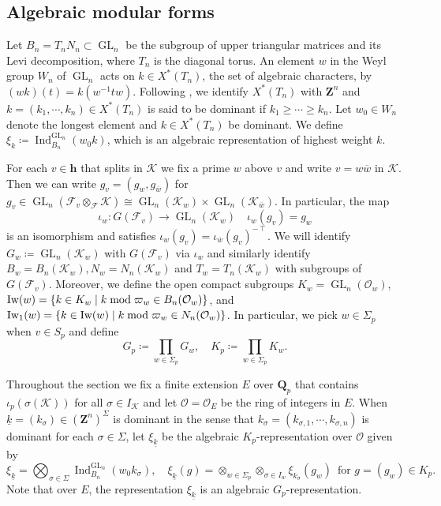 \documentclass[leqno]{amsart}
\theoremstyle{definition}
\theoremstyle{remark}
\newcommand{\oo}{\mathcal{O}}
\newcommand{\Z}{{\mathbf{Z}}}
\newcommand{\Qp}{\mathbf{Q}_p}
\newcommand{\finite}{\mathbf{h}}
\DeclareMathOperator{\Ind}{Ind}
\DeclareMathOperator{\GL}{GL}
\newcommand{\F}{{\mathcal{F}}} %
\newcommand{\K}{{\mathcal{K}}} %
\newcommand{\bw}{{\overline{w}}}
\newcommand{\wt}[1]{\underline{ #1 }}
\newcommand{\Iw}{\textnormal{Iw}} %
\begin{document}
\subsection{Algebraic modular forms}

Let $B_n=T_nN_n\subset \GL_n$ be the subgroup of
upper triangular matrices and its Levi decomposition,
where $T_n$ is the diagonal torus.
An element $w$ in the Weyl group $W_n$ of $\GL_n$
acts on $k\in X^*(T_n)$, the set of algebraic characters,
by $(wk)(t)=k(w^{-1}tw)$.
Following \cite[Def 2.3]{ger},
we identify $X^*(T_n)$ with $\Z^n$
and $k=(k_1,\cdots,k_n)\in X^*(T_n)$
is said to be dominant if $k_1\geq \cdots\geq k_n$.
Let $w_0\in W_n$ denote the longest element
and $k\in X^*(T_n)$ be dominant.
We define $\xi_k\coloneqq \Ind_{B_n}^{\GL_n}(w_0k)$,
which is an algebraic representation 
of highest weight $k$.

For each $v\in\finite$ that splits in $\K$
we fix a prime $w$ above $v$
and write $v=w\bw$ in $\K$.
Then we can write $g_v=(g_w,g_{\bw})$
for $g_v\in \GL_n(\F_v\otimes_\F\K)
\cong \GL_n(\K_w)\times\GL_n(\K_{\bw})$.
In particular, the map
\begin{equation}
\iota_w\colon G(\F_v)\to \GL_n(\K_w)\quad
\iota_w(g_v)=g_w
\end{equation}
is an isomorphism and satisfies
$\iota_w(g_v)=\iota_{\bw}(g_v)^{-\intercal}$.
We will identify $G_w\coloneqq\GL_n(\K_w)$
with $G(\F_v)$ via $\iota_w$
and similarly identify 
$B_w=B_n(\K_w), N_w=N_n(\K_w)$ and
$T_w=T_n(\K_w)$
with subgroups of $G(\F_v)$.
Moreover, we define the open 
compact subgroups
$K_w=\GL_n(\oo_w)$,
$\Iw(w)=\{k\in K_w\mid k\bmod \varpi_w\in B_n(\oo_w)\}$, and
$\Iw_1(w)=\{k\in \Iw(w)\mid k\bmod \varpi_w\in N_n(\oo_w)\}$.
In particular, we pick $w\in \Sigma_p$ when $v\in S_p$ and define
\[
	G_p\coloneqq\prod_{w\in \Sigma_p}G_w,\quad
	K_p\coloneqq\prod_{w\in \Sigma_p}K_w.
\]

Throughout the section
we fix a finite extension $E$ over $\Qp$
that contains $\iota_p(\sigma(\K))$
for all $\sigma\in I_\K$ and
let $\oo=\oo_E$ be the ring of integers in $E$.
When $\wt{k}=(k_\sigma)\in (\Z^n)^{\Sigma}$
is dominant in the sense that
$k_\sigma=(k_{\sigma,1},\cdots,k_{\sigma,n})$
is dominant for each $\sigma\in \Sigma$,
let $\xi_{\wt{k}}$ be
the algebraic $K_p$-representation over $\oo$ given by
\begin{equation}\label{def:algrep}
	\xi_{\wt{k}}=\bigotimes_{\sigma\in \Sigma}
	\Ind_{B_n}^{\GL_n}(w_0k_{\sigma}),\quad
	\xi_{\wt{k}}(g)=
	\otimes_{w\in \Sigma_p}
	\otimes_{\sigma\in I_w}\xi_{k_\sigma}(g_w)\,
	\text{ for } g=(g_w)\in K_p.
\end{equation}
Note that over $E$, the representation $\xi_{\wt{k}}$ 
is an algebraic $G_p$-representation.
\end{document}
